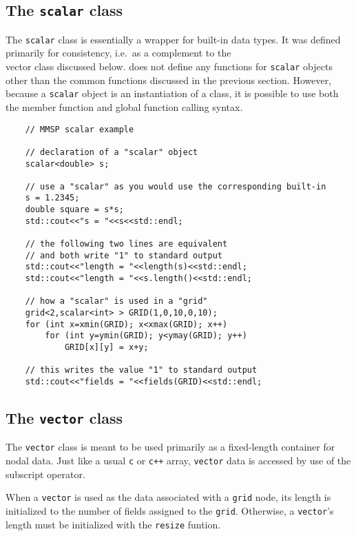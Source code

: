 \subsection{The {\tt scalar} class}
The {\tt scalar} class is essentially a wrapper for built-in data types.  It was defined primarily for consistency, i.e.\ as a complement to the {\\ vector} class discussed below.  \MMSP does not define any functions for {\tt scalar} objects other than the common functions discussed in the previous section.  However, because a {\tt scalar} object is an instantiation of a class, it is possible to use both the member function and global function calling syntax.
\begin{shadebox}
\begin{verbatim}
    // MMSP scalar example

    // declaration of a "scalar" object
    scalar<double> s;

    // use a "scalar" as you would use the corresponding built-in
    s = 1.2345;
    double square = s*s;
    std::cout<<"s = "<<s<<std::endl;

    // the following two lines are equivalent
    // and both write "1" to standard output
    std::cout<<"length = "<<length(s)<<std::endl;
    std::cout<<"length = "<<s.length()<<std::endl;

    // how a "scalar" is used in a "grid"
    grid<2,scalar<int> > GRID(1,0,10,0,10);
    for (int x=xmin(GRID); x<xmax(GRID); x++)
        for (int y=ymin(GRID); y<ymay(GRID); y++)
            GRID[x][y] = x+y;

    // this writes the value "1" to standard output
    std::cout<<"fields = "<<fields(GRID)<<std::endl;
\end{verbatim}
\end{shadebox}
\subsection{The {\tt vector} class}
The {\tt vector} class is meant to be used primarily as a fixed-length container for nodal data.  Just like a usual {\tt c} or {\tt c++} array, {\tt vector} data is accessed by use of the subscript operator.

When a {\tt vector} is used as the data associated with a {\tt grid} node, its length is initialized to the number of fields assigned to the {\tt grid}.  Otherwise, a {\tt vector}'s length must be initialized with the {\tt resize} funtion.


